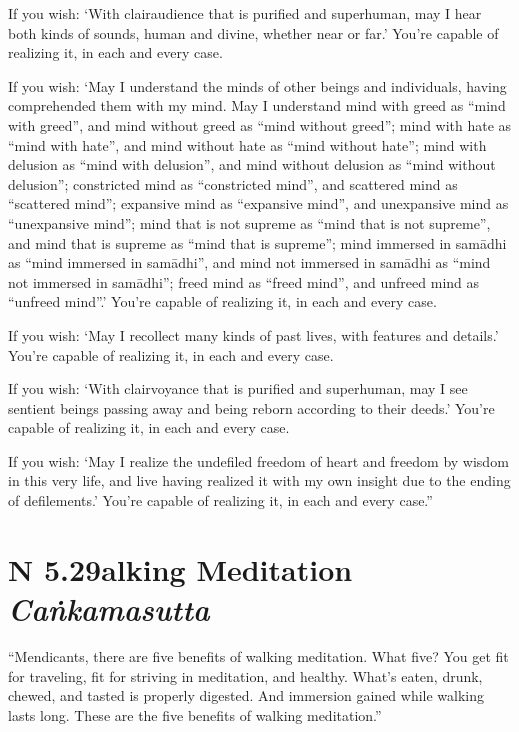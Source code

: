 \documentclass[12pt,openany]{book}%
\newcommand*{\suttatitleacronym}[1]{\smaller[2]{#1}\vspace*{.3em}}
\newcommand*{\suttatitletranslation}[1]{\linebreak{#1}}
\newcommand*{\suttatitleroot}[1]{\linebreak\smaller[2]\itshape{#1}}
\newcommand*{\tocacronym}[1]{\hspace*{-3.3em}{#1}\quad}
\newcommand*{\toctranslation}[1]{#1}
\newcommand*{\tocroot}[1]{(\textit{#1})}
\begin{document}
If you wish: ‘With clairaudience that is purified and superhuman, may I hear both kinds of sounds, human and divine, whether near or far.’ You’re capable of realizing it, in each and every case. 

If you wish: ‘May I understand the minds of other beings and individuals, having comprehended them with my mind. May I understand mind with greed as “mind with greed”, and mind without greed as “mind without greed”; mind with hate as “mind with hate”, and mind without hate as “mind without hate”; mind with delusion as “mind with delusion”, and mind without delusion as “mind without delusion”; constricted mind as “constricted mind”, and scattered mind as “scattered mind”; expansive mind as “expansive mind”, and unexpansive mind as “unexpansive mind”; mind that is not supreme as “mind that is not supreme”, and mind that is supreme as “mind that is supreme”; mind immersed in \textsanskrit{samādhi} as “mind immersed in \textsanskrit{samādhi}”, and mind not immersed in \textsanskrit{samādhi} as “mind not immersed in \textsanskrit{samādhi}”; freed mind as “freed mind”, and unfreed mind as “unfreed mind”.’ You’re capable of realizing it, in each and every case. 

If you wish: ‘May I recollect many kinds of past lives, with features and details.’ You’re capable of realizing it, in each and every case. 

If you wish: ‘With clairvoyance that is purified and superhuman, may I see sentient beings passing away and being reborn according to their deeds.’ You’re capable of realizing it, in each and every case. 

If you wish: ‘May I realize the undefiled freedom of heart and freedom by wisdom in this very life, and live having realized it with my own insight due to the ending of defilements.’ You’re capable of realizing it, in each and every case.” 

%
\section*{{\suttatitleacronym AN 5.29}{\suttatitletranslation Walking Meditation }{\suttatitleroot Caṅkamasutta}}
\addcontentsline{toc}{section}{\tocacronym{AN 5.29} \toctranslation{Walking Meditation } \tocroot{Caṅkamasutta}}

“Mendicants, there are five benefits of walking meditation. What five? You get fit for traveling, fit for striving in meditation, and healthy. What’s eaten, drunk, chewed, and tasted is properly digested. And immersion gained while walking lasts long. These are the five benefits of walking meditation.” 
\end{document}

